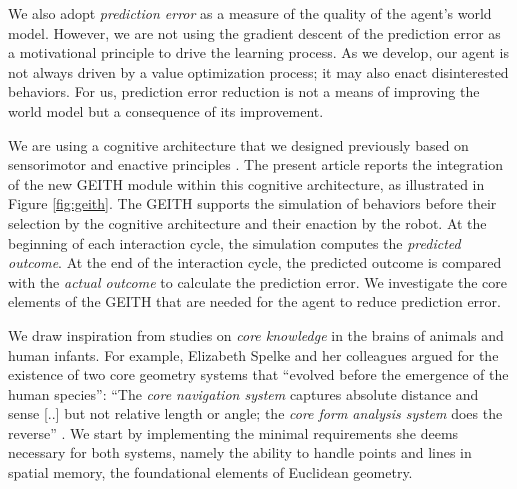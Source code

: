 \documentclass[runningheads]{llncs}
\begin{document}
We also adopt \textit{prediction error} as a measure of the quality of the agent's world model. %
However, we are not using the gradient descent of the prediction error as a motivational principle to drive the learning process. 
As we develop, our agent is not always driven by a value optimization process; it may also enact disinterested behaviors.
For us, prediction error reduction is not a means of improving the world model but a consequence of its improvement.

We are using a cognitive architecture that we designed previously based on sensorimotor and enactive principles \cite{georgeon_artificial_2024}. 
The present article reports the integration of the new GEITH module within this cognitive architecture, as illustrated in Figure \ref{fig:geith}. 
The GEITH supports the simulation of behaviors before their selection by the cognitive architecture and their enaction by the robot. 
At the beginning of each interaction cycle, the simulation computes the \textit{predicted outcome}.
At the end of the interaction cycle, the predicted outcome is compared with the \textit{actual outcome} to calculate the prediction error.   
We investigate the core elements of the GEITH that are needed for the agent to reduce prediction error. 

We draw inspiration from studies on \textit{core knowledge} in the brains of animals and human infants. 
For example, Elizabeth Spelke and her colleagues argued for the existence of two core geometry systems that ``evolved before the emergence of the human species'':  
``The \textit{core navigation system} captures absolute distance and sense [..] but not relative length or angle; the \textit{core form analysis system} does the reverse'' \cite[p. 2789]{spelke_core_2012}.
We start by implementing the minimal requirements she deems necessary for both systems, namely the ability to handle points and lines in spatial memory, the foundational elements of Euclidean geometry. 
\end{document}
